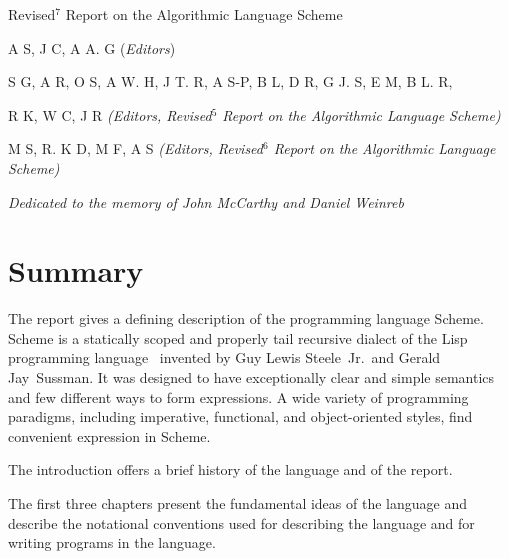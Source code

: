 

\begin{center}

Revised$^7$ Report on the Algorithmic Language Scheme

A S,
J C,
A A. G
(\textit{Editors})

S G,
A R,
O S,
A W. H,
J T. R,
A S-P,
B L,
D R,
G J. S,
E M,
B L. R,

R K,
W C,
J R
{\textit{(Editors, Revised$^5$ Report on the Algorithmic Language Scheme)}}

M S,
R. K D, M F,
A  S
{\textit{(Editors, Revised$^6$ Report on the Algorithmic Language Scheme)}}

{\it Dedicated to the memory of John McCarthy and Daniel Weinreb}

\end{center}


\chapter*{Summary}

The report gives a defining description of the programming language
Scheme.  Scheme is a statically scoped and properly tail recursive
dialect of the Lisp programming language~\cite{McCarthy} invented by Guy Lewis
Steele~Jr.\ and Gerald Jay~Sussman.  It was designed to have
exceptionally clear and simple semantics and few different ways to
form expressions.  A wide variety of programming paradigms, including
imperative, functional, and object-oriented styles, find convenient
expression in Scheme.

\vest The introduction offers a brief history of the language and of
the report.

\vest The first three chapters present the fundamental ideas of the
language and describe the notational conventions used for describing the
language and for writing programs in the language.

